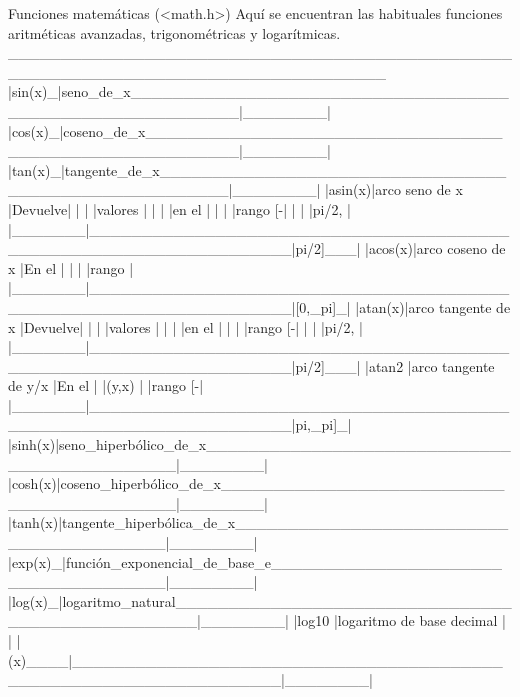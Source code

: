 Funciones matemáticas (<math.h>)
Aquí se encuentran las habituales funciones aritméticas avanzadas,
trigonométricas y logarítmicas.
 ____________________________________________________________________________________
|sin(x)_|seno_de_x__________________________________________________________|________|
|cos(x)_|coseno_de_x________________________________________________________|________|
|tan(x)_|tangente_de_x______________________________________________________|________|
|asin(x)|arco seno de x                                                     |Devuelve|
|       |                                                                   |valores |
|       |                                                                   |en el   |
|       |                                                                   |rango [-|
|       |                                                                   |pi/2,   |
|_______|___________________________________________________________________|pi/2]___|
|acos(x)|arco coseno de x                                                   |En el   |
|       |                                                                   |rango   |
|_______|___________________________________________________________________|[0,_pi]_|
|atan(x)|arco tangente de x                                                 |Devuelve|
|       |                                                                   |valores |
|       |                                                                   |en el   |
|       |                                                                   |rango [-|
|       |                                                                   |pi/2,   |
|_______|___________________________________________________________________|pi/2]___|
|atan2  |arco tangente de y/x                                               |En el   |
|(y,x)  |                                                                   |rango [-|
|_______|___________________________________________________________________|pi,_pi]_|
|sinh(x)|seno_hiperbólico_de_x_____________________________________________|________|
|cosh(x)|coseno_hiperbólico_de_x___________________________________________|________|
|tanh(x)|tangente_hiperbólica_de_x_________________________________________|________|
|exp(x)_|función_exponencial_de_base_e_____________________________________|________|
|log(x)_|logaritmo_natural__________________________________________________|________|
|log10  |logaritmo de base decimal                                          |        |
|(x)____|___________________________________________________________________|________|
